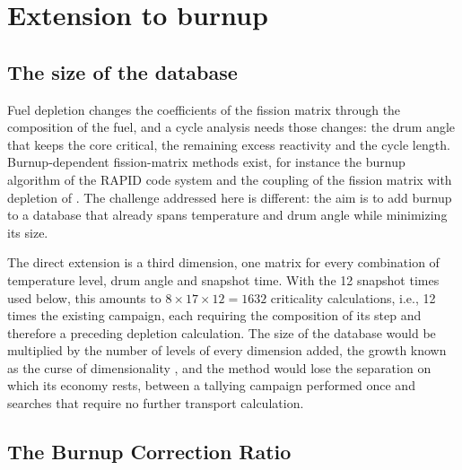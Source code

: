 \section{Extension to burnup}\label{cs:sec:burnup}

\subsection{The size of the database}

Fuel depletion changes the coefficients of the fission matrix through the
composition of the fuel, and a cycle analysis needs those changes: the drum
angle that keeps the core critical, the remaining excess reactivity and the
cycle length. Burnup-dependent fission-matrix methods exist, for instance the
burnup algorithm of the RAPID code system \cite{pungercic2023brapid} and the
coupling of the fission matrix with depletion of \citet{he2024combined}.
The challenge addressed here is different: the aim is to add burnup to a
database that already spans temperature and drum angle while minimizing its
size.

The direct extension is a third dimension, one matrix for every combination of
temperature level, drum angle and snapshot time. With the 12 snapshot times used below, this amounts to
$8\times17\times12=1632$ criticality calculations, i.e., 12 times the existing
campaign, each requiring the composition of its step and therefore a preceding
depletion calculation. The size of the database would be multiplied by the number of
levels of every dimension added, the growth known as the curse of
dimensionality \cite{Bellman1957}, and the method would lose the separation on which
its economy rests, between a tallying campaign performed once and searches
that require no further transport calculation.

\subsection{The Burnup Correction Ratio}\label{cs:sec:bcr}

